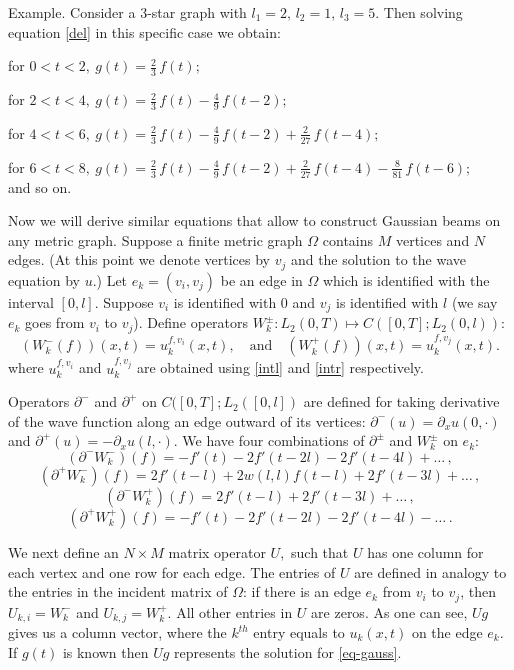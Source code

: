 \documentclass[11pt]{amsart}
\theoremstyle{definition}
\theoremstyle{plain}
\numberwithin{equation}{section}
\begin{document}
Example. Consider a 3-star graph with $l_1=2,\,l_2=1,\,l_3=5.$ Then solving equation \eqref{del} in this specific case we obtain:

for $0<t<2, \ g(t)=\frac23\,f(t);$

for $2<t<4, \ g(t)=\frac23\,f(t)-\frac49\,f(t-2);$

for $4<t<6, \ g(t)=\frac23\,f(t)-\frac49\,f(t-2)+\frac{2}{27}\,f(t-4);$

for $6<t<8, \ g(t)=\frac23\,f(t)-\frac49\,f(t-2)+\frac{2}{27}\,f(t-4)-\frac8{81}\,f(t-6);$ \\ and so on.

Now we will derive similar equations that allow to construct Gaussian beams on any metric graph. Suppose a finite metric graph $\Omega$ contains  $M$ vertices and $N$ edges. (At this point we denote vertices by $v_j$ and the solution to the wave equation by $u.$)
Let $e_k=(v_i, v_j)$ be an edge in $\Omega$ which is identified with the interval $[0,l]$.  Suppose $v_i$ is identified with $0$ and $v_j$ is identified with $l$ (we say $e_k$ goes from $v_i$ to $v_j$).  Define operators $W_k^\pm: L_2(0,T) \mapsto C([0,T];L_2(0,l))$: $$(W_k^-(f)) (x,t) = u_k^{f, v_i}(x,t), \quad \textrm{and} \quad  (W_k^+(f)) (x,t) = u_k^{f, v_j}(x,t).$$ 
 where $u_k^{f, v_i}$ and $u_k^{f, v_j}$ are obtained using \eqref{intl} and \eqref{intr} respectively.  

Operators $\partial^-$ and $\partial^+$ on $C([0,T]; L_2([0,l])$ are defined for taking derivative of the wave function along an edge outward of its vertices: $\partial^-(u) = \partial_x u (0, \cdot)$ and $\partial^+(u) = -\partial_x u (l, \cdot)$.  We have four combinations of $\partial^\pm$ and $W_k^\pm$ on $e_k$:
$$
(\partial^- W^-_k) (f) = -f'(t)   
-2f'(t-2l) 
-2f'(t-4l) +\dots \,,
$$
$$
(\partial^+ W^-_k) (f)= 2f'(t-l) +2w(l,l) f(t-l)
+2f'(t-3l)  +\dots \,,
$$
$$
(\partial^- W^+_k) (f)=2f'(t-l) 
+2 f'(t-3l) +\dots \,,
$$
$$
(\partial^+ W^+_k) (f)=-f'(t)  
-2f'(t-2l) 
-2f'(t-4l)  -\dots \,.
$$

We next define an $N \times M$ matrix operator $U,$ such that $U$ has one column for each vertex and one row for each edge.  The entries of $U$ are defined in analogy to the entries in the incident matrix of $\Omega$:  if there is an edge $e_k$ from $v_i$ to $v_j$, then $U_{k,i}=W_k^-$ and $U_{k,j}=W_k^+$.  All other entries in $U$ are zeros.  As one can see, $Ug$ gives us a column vector, where the $k^{th}$ entry equals to $u_k(x,t)$ on the edge $e_k$. If $g(t)$ is known then $Ug$ represents the solution for \eqref{eq-gauss}. 
\end{document}
